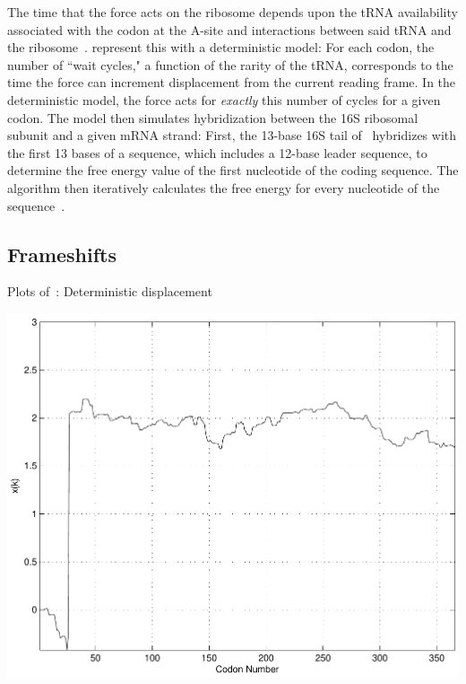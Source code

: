 \documentclass[twocolumn]{article}
\begin{document}
The time that the force acts on the ribosome depends upon
the tRNA availability associated with the codon at the A-site 
and interactions between said tRNA and the ribosome~\cite{phelps}.
\citeauthor{lalit:mechanics} represent this with a deterministic model: For each codon,
the number of ``wait cycles," a function of the rarity of the
tRNA, corresponds to the time the force can
increment displacement from the current reading frame.  In the
deterministic model, the force acts for \emph{exactly} this number
of cycles for a given codon. The model then
simulates hybridization between the
16S ribosomal subunit and a given mRNA strand: First, the 13-base 16S
tail of \ecoli\ hybridizes with the first 13 bases of a sequence,
which includes a 12-base leader sequence, to determine the free energy 
value of the first nucleotide of the coding sequence. The algorithm then iteratively calculates
the free energy for every nucleotide of the sequence~\cite{starmer}.

\subsection{Frameshifts}
\label{section:frameshifts}

\begin{cfigure}
  \caption{Plots of~\prfB: Deterministic displacement}
  \label{prfB:deterministic:sub}
  \includegraphics[width=\linewidth]{prfB/deterministic}
\end{cfigure}
\end{document}

